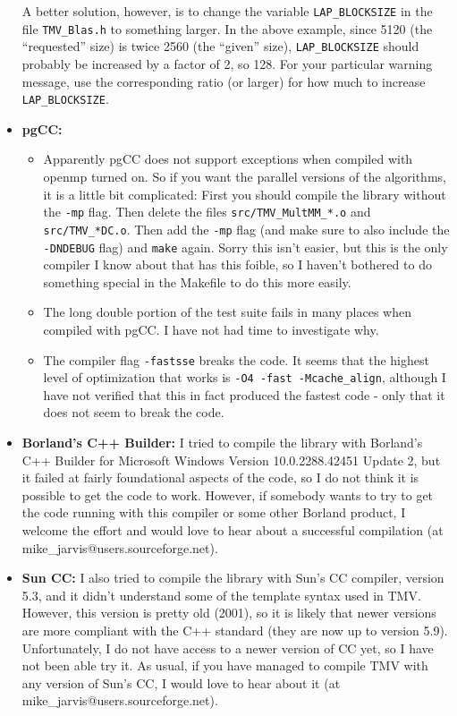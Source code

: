 \documentclass[twoside,letterpaper,11pt]{article}
\makeatletter
\renewcommand{\tt}[1]{{\texttt {#1}}}
\newcommand{\myemail}{mike\_jarvis@users.sourceforge.net}
\makeatother
\begin{document}
\begin{itemize}
A better solution, however, is to change the variable \tt{LAP\_BLOCKSIZE}
in the file \tt{TMV\_Blas.h} to something larger.
In the above example, since
5120 (the ``requested'' size) is twice 2560 (the ``given'' size), 
\tt{LAP\_BLOCKSIZE} should probably be increased by a factor of 2, so 128.
For your particular warning message, use the corresponding ratio (or larger)
for how much to increase \tt{LAP\_BLOCKSIZE}.

\item {\bf pgCC:}
\begin{itemize}
\item
Apparently pgCC does not support exceptions when compiled with openmp turned
on.  So if you want the parallel versions of the algorithms, it is a little bit complicated:
First you should compile the library without the \tt{-mp} flag.  Then delete the files
\tt{src/TMV\_MultMM\_*.o} and \tt{src/TMV\_*DC.o}.  Then add the \tt{-mp} flag (and make
sure to also include the \tt{-DNDEBUG} flag) and \tt{make} again.  Sorry this isn't
easier, but this is the only compiler I know about that has this foible, so I haven't
bothered to do something special in the Makefile to do this more easily.

\item 
The long double portion of the test suite fails in many places when compiled with pgCC.  
I have not had time to investigate why.

\item
The compiler flag \tt{-fastsse} breaks the code.  It seems that the highest level of optimization 
that works is
\tt{-O4 -fast -Mcache\_align}, although I have not verified that this in fact produced the fastest
code - only that it does not seem to break the code.
\end{itemize}

\item {\bf Borland's C++ Builder:}
I tried to compile the library with Borland's C++ Builder for Microsoft Windows
Version 10.0.2288.42451 Update 2, but it failed at fairly foundational aspects of the 
code, so I do not think it is possible to get the code to work.  However, if somebody wants
to try to get the code running with this compiler or some other Borland product, 
I welcome the effort and would
love to hear about a successful compilation (at \myemail).

\item {\bf Sun CC:}
I also tried to compile the library with Sun's CC compiler, version 5.3, 
and it didn't understand some of the template syntax used in TMV.  However,
this version is pretty old (2001), so it is likely that newer versions are more
compliant with the C++ standard (they are now up to version 5.9).  
Unfortunately, I do not have access to a newer version of CC yet, so I have not
been able try it.  As usual, if you have managed to compile TMV with
any version of Sun's CC, I would love to hear about it (at \myemail).

\end{itemize}
\end{document}
